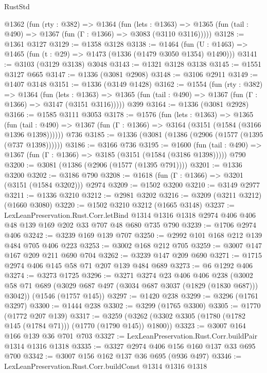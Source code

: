 \begin{lexlean}{RustStd}
\begin{coremodule}
{\begin{coremodule}
{{{{{{{{{{{{{{  @1362
    (fun (rty : @382) =>
    @1364
      (fun (lets : @1363) =>
      @1365 (fun (tail : @490) => @1367 (fun (Γ : @1366) => @3083 (@3110 @3116)))))
@3128 := @1361 @3127
@3129 := @1358 @3128
@3138 := @1464 (fun (U : @1463) => @1465 (fun (t : @29) => @1473 (@1336 (@1479 @3050 @1354) @1490)))
@3141 := @3103 (@3129 @3138) @3048
@3143 := @1321 @3128 @3138
@3145 := @1551 @3127 @665
@3147 := @1336 (@3081 @2908)
@3148 := @3106 @2911
@3149 := @1407 @3148
@3151 := @1336 (@3149 @1428)
@3162 := @1554
    (fun (rty : @382) =>
    @1364
      (fun (lets : @1363) =>
      @1365 (fun (tail : @490) => @1367 (fun (Γ : @1366) => @3147 (@3151 @3116)))))
    @399
@3164 := @1336 (@3081 @2928)
@3166 := @1585 @3111 @3053
@3178 := @1576
    (fun (lets : @1363) =>
    @1365
      (fun (tail : @490) => @1367 (fun (Γ : @1366) => @3164 (@3151 (@1584 (@3166 @1396 @1398))))))
    @736
@3185 := @1336 (@3081 (@1386 (@2906 (@1577 (@1395 (@737 @1398))))))
@3186 := @3166 @736
@3195 := @1600
    (fun (tail : @490) => @1367 (fun (Γ : @1366) => @3185 (@3151 (@1584 (@3186 @1398)))))
    @790
@3200 := @3081 (@1386 (@2906 (@1577 (@1395 @791))))
@3201 := @1336 @3200
@3202 := @3186 @790
@3208 := @1618 (fun (Γ : @1366) => @3201 (@3151 (@1584 @3202))) @2974
@3209 := @1502 @3200
@3210 := @3149 @2977
@3211 := @1336 @3210
@3212 := @2981 @3202
@3216 := @3209 (@3211 @3212) (@1660 @3080)
@3220 := @1502 @3210 @3212 (@1665 @3148)
@3237 := LexLeanPreservation.Rust.Corr.letBind
    @1314
    @1316
    @1318
    @2974
    @406
    @406
    @48
    @139
    @169
    @202
    @33
    @707
    @48
    @680
    @735
    @790
@3239 := @1706 @2974 @406
@3242 := @3239 @169 @139 @707
@3250 := @2992 @101 @168 @212 @139 @484 @705 @406 @223
@3253 := @3002 @168 @212 @705
@3259 := @3007 @147 @167 @209 @211 @690 @704
@3262 := @3239 @147 @209 @690
@3271 := @1715 @2974 @406 @145 @58 @71 @207 @139 @484 @689
@3273 := @6 @1292 @406
@3274 := @3273 @1725
@3296 := @3271
    @3274
    @23
    @406
    @406
    @238
    (@3002 @58 @71 @689 (@3029 @687 @497 (@3034 @687 @3037 (@1829 (@1830 @687))) @3042))
    (@1546 (@1757 @145))
@3297 := @1420 @238
@3299 := @3296 (@1761 @3297)
@3300 := @1444 @238
@3302 := @3299 (@1765 @3300)
@3305 := @1770 (@1772 @207 @139)
@3317 := @3259 (@3262 (@3302 @3305 (@1780 (@1782 @145 (@1784 @71))) (@1770 (@1790 @145)) @1800))
@3323 := @3007 @164 @166 @139 @36 @701 @703
@3327 := LexLeanPreservation.Rust.Corr.buildPair @1314 @1316 @1318
@3335 := @3327 @2974 @406 @156 @160 @137 @33 @695 @700
@3342 := @3007 @156 @162 @137 @36 @695 (@936 @497)
@3346 := LexLeanPreservation.Rust.Corr.buildConst @1314 @1316 @1318
}}}}}}}}}}}}}}
\end{coremodule}}
\end{coremodule}
\end{lexlean}
